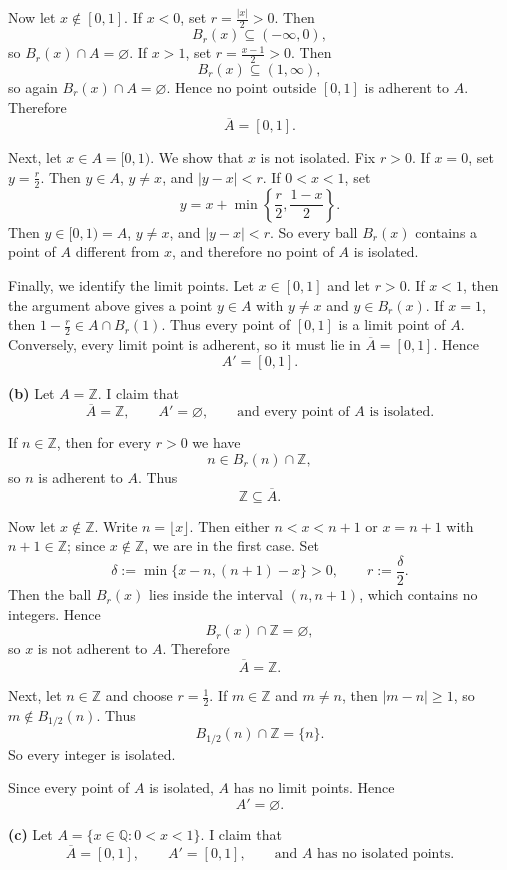 \documentclass[12pt]{article}
\begin{document}
Now let $x\notin[0,1]$. If $x<0$, set $r=\frac{|x|}{2}>0$. Then
\[
B_r(x)\subseteq (-\infty,0),
\]
so $B_r(x)\cap A=\varnothing$. If $x>1$, set $r=\frac{x-1}{2}>0$. Then
\[
B_r(x)\subseteq (1,\infty),
\]
so again $B_r(x)\cap A=\varnothing$. Hence no point outside $[0,1]$ is adherent to $A$. Therefore
\[
\overline{A}=[0,1].
\]

Next, let $x\in A=[0,1)$. We show that $x$ is not isolated. Fix $r>0$. If $x=0$, set $y=\frac r2$. Then $y\in A$, $y\neq x$, and $|y-x|<r$. If $0<x<1$, set
\[
y=x+\min\left\{\frac r2,\frac{1-x}{2}\right\}.
\]
Then $y\in[0,1) = A$, $y\neq x$, and $|y-x|<r$. So every ball $B_r(x)$ contains a point of $A$ different from $x$, and therefore no point of $A$ is isolated.

Finally, we identify the limit points. Let $x\in[0,1]$ and let $r>0$. If $x<1$, then the argument above gives a point $y\in A$ with $y\neq x$ and $y\in B_r(x)$. If $x=1$, then $1-\frac r2\in A\cap B_r(1)$. Thus every point of $[0,1]$ is a limit point of $A$. Conversely, every limit point is adherent, so it must lie in $\overline{A}=[0,1]$. Hence
\[
A'=[0,1].
\]

\textbf{(b) }Let $A=\mathbb{Z}$. I claim that
\[
\overline{A}=\mathbb{Z},
\qquad
A'=\varnothing,
\qquad
\text{and every point of }A\text{ is isolated}.
\]

If $n\in\mathbb{Z}$, then for every $r>0$ we have
\[
n\in B_r(n)\cap \mathbb{Z},
\]
so $n$ is adherent to $A$. Thus
\[
\mathbb{Z}\subseteq \overline{A}.
\]

Now let $x\notin\mathbb{Z}$. Write $n=\lfloor x\rfloor$. Then either $n<x<n+1$ or $x=n+1$ with $n+1\in\mathbb{Z}$; since $x\notin\mathbb{Z}$, we are in the first case. Set
\[
\delta:=\min\{x-n,(n+1)-x\}>0,
\qquad
r:=\frac{\delta}{2}.
\]
Then the ball $B_r(x)$ lies inside the interval $(n,n+1)$, which contains no integers. Hence
\[
B_r(x)\cap \mathbb{Z}=\varnothing,
\]
so $x$ is not adherent to $A$. Therefore
\[
\overline{A}=\mathbb{Z}.
\]

Next, let $n\in\mathbb{Z}$ and choose $r=\tfrac12$. If $m\in\mathbb{Z}$ and $m\neq n$, then $|m-n|\ge 1$, so $m\notin B_{1/2}(n)$. Thus
\[
B_{1/2}(n)\cap \mathbb{Z}=\{n\}.
\]
So every integer is isolated.

Since every point of $A$ is isolated, $A$ has no limit points. Hence
\[
A'=\varnothing.
\]

\textbf{(c) }Let $A=\{x\in\mathbb{Q}:0<x<1\}$. I claim that
\[
\overline{A}=[0,1],
\qquad
A'=[0,1],
\qquad
\text{and }A\text{ has no isolated points}.
\]
\end{document}
